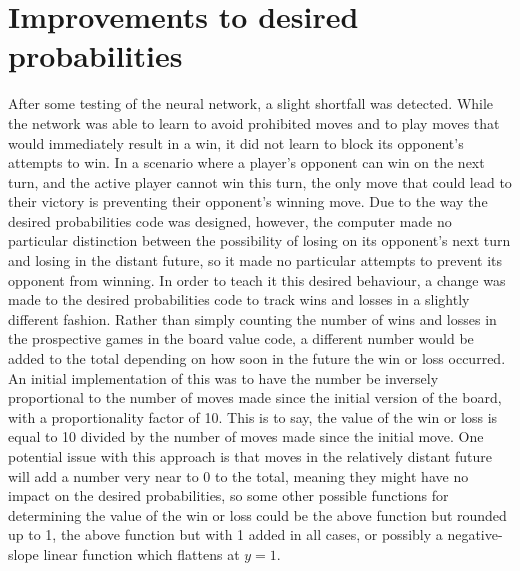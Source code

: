 \documentclass[12pt]{article}
\begin{document}
\section{Improvements to desired probabilities}
After some testing of the neural network, a slight shortfall was detected. While the network was able to learn to avoid prohibited moves and to play moves that would immediately result in a win, it did not learn to block its opponent’s attempts to win. In a scenario where a player’s opponent can win on the next turn, and the active player cannot win this turn, the only move that could lead to their victory is preventing their opponent’s winning move. Due to the way the desired probabilities code was designed, however, the computer made no particular distinction between the possibility of losing on its opponent’s next turn and losing in the distant future, so it made no particular attempts to prevent its opponent from winning. In order to teach it this desired behaviour, a change was made to the desired probabilities code to track wins and losses in a slightly different fashion. Rather than simply counting the number of wins and losses in the prospective games in the board value code, a different number would be added to the total depending on how soon in the future the win or loss occurred. An initial implementation of this was to have the number be inversely proportional to the number of moves made since the initial version of the board, with a proportionality factor of 10. This is to say, the value of the win or loss is equal to 10 divided by the number of moves made since the initial move. One potential issue with this approach is that moves in the relatively distant future will add a number very near to 0 to the total, meaning they might have no impact on the desired probabilities, so some other possible functions for determining the value of the win or loss could be the above function but rounded up to 1, the above function but with 1 added in all cases, or possibly a negative-slope linear function which flattens at $y=1$.
\end{document}
